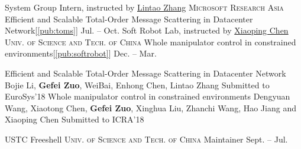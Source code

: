 \documentclass[10pt,a4paper]{article}
\begin{document}
\headedsection
{System Group Intern, instructed by \href{https://www.microsoft.com/en-us/research/people/lintaoz/}{Lintao Zhang}}
{\textsc{Microsoft Research Asia}}
{
	\headedsubsection
	{Efficient and Scalable Total-Order Message Scattering in Datacenter Network[\ref{pub:toms}]}
	{Jul. -- Oct.}
	{}
}
\headedsection
{Soft Robot Lab, instructed by \href{http://ai.ustc.edu.cn/}{Xiaoping Chen}}
{\textsc{Univ. of Science and Tech. of China}}
{
	\headedsubsection
	{Whole manipulator control in constrained environments[\ref{pub:softrobot}]}
	{Dec. -- Mar.}
	{}
}

\spacedhrule{0.2em}{-1em}
\publication
	{Efficient and Scalable Total-Order Message Scattering in Datacenter Network\label{pub:toms}}
	{Bojie Li, \textbf{Gefei Zuo}, WeiBai, Enhong Chen, Lintao Zhang}
	{Submitted to EuroSys'18}
\publication
	{Whole manipulator control in constrained environments\label{pub:softrobot}}
	{Dengyuan Wang, Xiaotong Chen, \textbf{Gefei Zuo}, Xinghua Liu, Zhanchi Wang, Hao Jiang and Xiaoping Chen}
	{Submitted to ICRA'18}
\spacedhrule{0.5em}{-1em}


\headedsection  %
{USTC Freeshell}
{\textsc{Univ. of Science and Tech. of China}} {
	\headedsubsection
	{Maintainer}
	{Sept. -- Jul.}
	{}
	}
\end{document}
